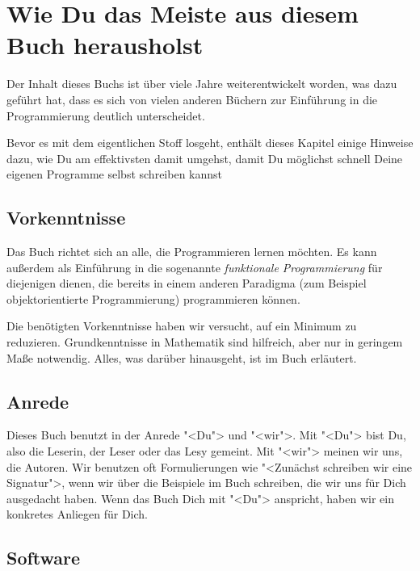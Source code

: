
\setcounter{chapter}{-1}
\chapter{Wie Du das Meiste aus diesem Buch herausholst}

Der Inhalt dieses Buchs ist über viele Jahre weiterentwickelt worden,
was dazu geführt hat, dass es sich von vielen anderen Büchern zur
Einführung in die Programmierung deutlich unterscheidet.

Bevor es mit dem eigentlichen Stoff losgeht, enthält dieses Kapitel
einige Hinweise dazu, wie Du am effektivsten damit umgehst, damit Du
möglichst schnell Deine eigenen Programme selbst schreiben kannst

\section{Vorkenntnisse}

Das Buch richtet sich an alle, die Programmieren
lernen möchten.  Es kann außerdem als Einführung in die sogenannte
\textit{funktionale Programmierung} für diejenigen dienen,
die bereits in einem anderen Paradigma (zum Beispiel objektorientierte
Programmierung) programmieren können.

Die benötigten Vorkenntnisse haben wir versucht, auf ein Minimum zu
reduzieren.  Grundkenntnisse in Mathematik sind hilfreich, aber nur in
geringem Maße notwendig.  Alles, was darüber hinausgeht, ist im Buch
erläutert. 

\section{Anrede}

Dieses Buch benutzt in der Anrede "<Du"> und "<wir">.  Mit "<Du"> bist
Du, also die Leserin, der Leser oder das Lesy gemeint.  Mit "<wir"> meinen wir
uns, die Autoren.  Wir benutzen oft Formulierungen wie "<Zunächst
schreiben wir eine Signatur">, wenn wir über die Beispiele im Buch
schreiben, die wir uns für Dich ausgedacht haben.  Wenn das Buch Dich
mit "<Du"> anspricht, haben wir ein konkretes Anliegen für Dich.

\section{Software}
\label{sec:racket}


